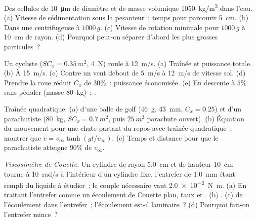 \begin{exercise}[$\star\star$]\label{exo:b2:viscous-flows:6}
Des cellules de \qty{10}{\micro m} de diamètre et de masse volumique \qty{1050}{kg/m^3} dans l'eau.
(a) Vitesse de sédimentation sous la pesanteur~; temps pour parcourir \qty{5}{cm}. (b) Dans
une centrifugeuse à $1000\,g$. (c) Vitesse de rotation minimale pour $1000\,g$ à
\qty{10}{cm} de rayon. (d) Pourquoi peut-on séparer d'abord les plus grosses particules~?
\end{exercise}

\begin{exercise}[$\star\star$]\label{exo:b2:viscous-flows:7}
Un cycliste ($SC_x = \qty{0.35}{m^2}$,  \qty{4}{N}) roule à
\qty{12}{m/s}. (a) Traînée et puissance totale. (b) À \qty{15}{m/s}. (c) Contre un
vent debout de \qty{5}{m/s} à \qty{12}{m/s} de vitesse sol. (d) Prendre la roue réduit
$C_x$ de $30\%$~: puissance économisée. (e) En descente à $5\%$ sans pédaler
(masse \qty{80}{kg})~: .
\end{exercise}

\begin{exercise}[$\star\star$]\label{exo:b2:viscous-flows:8}
Traînée quadratique. (a)  d'une balle de golf (\qty{46}{g}, \qty{43}{mm},
$C_x = 0.25$) et d'un parachutiste (\qty{80}{kg}, $SC_x = \qty{0.7}{m^2}$, puis
$\qty{25}{m^2}$ parachute ouvert). (b) Équation du mouvement pour une chute
partant du repos avec traînée quadratique~; montrer que $v = v_\infty\tanh(gt/v_\infty)$. (c)
Temps et distance pour que le parachutiste atteigne $90\%$ de $v_\infty$.
\end{exercise}

\begin{exercise}[$\star\star$]\label{exo:b2:viscous-flows:9}
\emph{Viscosimètre de Couette.} Un cylindre de rayon \qty{5.0}{cm} et de hauteur
\qty{10}{cm} tourne à \qty{10}{rad/s} à l'intérieur d'un cylindre fixe, l'entrefer de
\qty{1.0}{mm} étant rempli du liquide à étudier~; le couple nécessaire vaut
\qty{2.0e-2}{N.m}. (a) En traitant l'entrefer comme un écoulement de Couette plan, taux
et . (b) . (c)  de l'écoulement dans l'entrefer~;
l'écoulement est-il laminaire~? (d) Pourquoi fait-on l'entrefer mince~?
\end{exercise}


